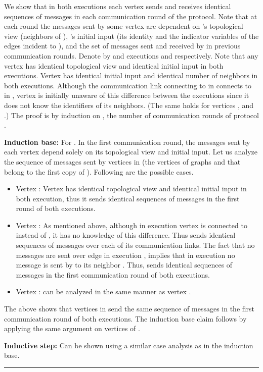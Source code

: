 \documentclass[11pt,letter]{article}
\newcommand{\qed}{\rule{7pt}{7pt}}
\newenvironment{proof}{\noindent{\bf Proof}\hspace*{1em}}{\qed\bigskip}
\begin{document}
\begin{proof}
We show that in both executions each vertex sends and receives identical 
sequences of messages in each communication round of the protocol. 
Note that at each round the messages sent by some vertex  are dependent 
on 's topological view (neighbors of ), 's initial input 
(its identity and the indicator variables of the edges incident to ), and 
the set of messages sent and received by  in previous communication rounds.
Denote by  and   executions  and  
 respectively. Note that any vertex 
 has identical topological view and 
identical initial input in both executions. Vertex  has identical 
initial input and  identical number of neighbors in both  executions. 
Although the communication link connecting  to  in  connects 
 to  in , vertex  is initially unaware of this difference 
between the executions since it does not know the identifiers of its neighbors.
(The same holds for vertices ,  and .) 
The proof is by induction on , 
the number of communication rounds of protocol .

\noindent\textbf{Induction base:} For . In the first communication round, 
the messages sent by each vertex depend solely on its topological view 
and initial input. Let us analyze the sequence of messages sent by vertices 
in  (the vertices of graphs  and  that belong to the first copy 
of ). Following are the possible cases.

\begin{itemize}
\item Vertex : Vertex  has identical topological view 
and identical initial input in both execution, thus it sends identical 
sequences of messages in the first round of both executions.
\item
Vertex : As mentioned above, although in execution  vertex  
is connected to  instead of , it has no knowledge of this difference. 
Thus   sends identical sequences of messages over each of its communication 
links. The fact that no messages are sent over edge  in execution , 
implies that in execution  no message is sent by  to its 
neighbor . Thus,  sends identical sequences of messages in the 
first communication round of both executions.
\item
Vertex : can be analyzed in the same manner as vertex .
\end{itemize}
\noindent
The above shows that  vertices in  send the same sequence of messages 
in the first communication round of both executions. The induction base claim 
follows by applying the same argument on vertices of .

\noindent\textbf{Inductive step:} Can be shown using a similar case analysis as 
in the induction base.
\end{proof}
\end{document}
